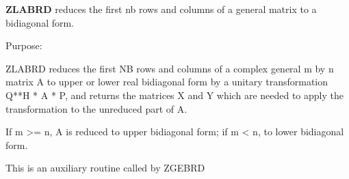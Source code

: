 {\bfseries Z\+L\+A\+B\+R\+D} reduces the first nb rows and columns of a general matrix to a bidiagonal form. 

 \begin{DoxyParagraph}{Purpose\+: }
\begin{DoxyVerb} ZLABRD reduces the first NB rows and columns of a complex general
 m by n matrix A to upper or lower real bidiagonal form by a unitary
 transformation Q**H * A * P, and returns the matrices X and Y which
 are needed to apply the transformation to the unreduced part of A.

 If m >= n, A is reduced to upper bidiagonal form; if m < n, to lower
 bidiagonal form.

 This is an auxiliary routine called by ZGEBRD\end{DoxyVerb}
 
\end{DoxyParagraph}

